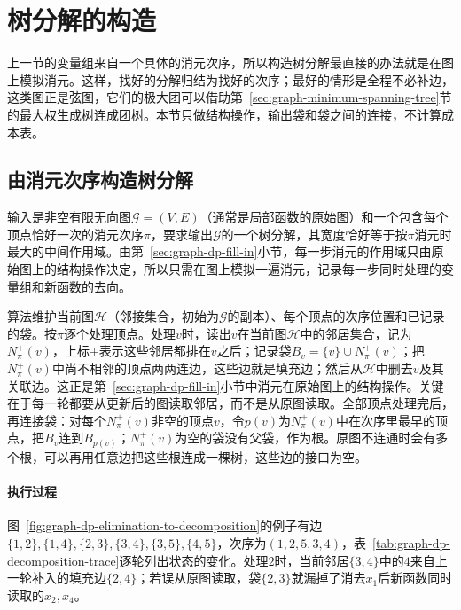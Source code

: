 
\section{树分解的构造}
\label{sec:graph-tree-decomposition-construction}

上一节的变量组来自一个具体的消元次序，所以构造树分解最直接的办法就是在图上模拟消元。这样，找好的分解归结为找好的次序；最好的情形是全程不必补边，这类图正是弦图，它们的极大团可以借助第~\ref{sec:graph-minimum-spanning-tree}节的最大权生成树连成团树。本节只做结构操作，输出袋和袋之间的连接，不计算成本表。

\subsection{由消元次序构造树分解}
\label{sec:graph-dp-order-to-decomposition}

输入是非空有限无向图$\mathcal G=(V,E)$（通常是局部函数的原始图）和一个包含每个顶点恰好一次的消元次序$\pi$，要求输出$\mathcal G$的一个树分解，其宽度恰好等于按$\pi$消元时最大的中间作用域。由第~\ref{sec:graph-dp-fill-in}小节，每一步消元的作用域只由原始图上的结构操作决定，所以只需在图上模拟一遍消元，记录每一步同时处理的变量组和新函数的去向。

算法维护当前图$\mathcal H$（邻接集合，初始为$\mathcal G$的副本）、每个顶点的次序位置和已记录的袋。按$\pi$逐个处理顶点。处理$v$时，读出$v$在当前图$\mathcal H$中的邻居集合，记为$N^+_\pi(v)$，上标$+$表示这些邻居都排在$v$之后；记录袋$B_v=\{v\}\cup N^+_\pi(v)$；把$N^+_\pi(v)$中尚不相邻的顶点两两连边，这些边就是填充边；然后从$\mathcal H$中删去$v$及其关联边。这正是第~\ref{sec:graph-dp-fill-in}小节中消元在原始图上的结构操作。关键在于每一轮都要从更新后的图读取邻居，而不是从原图读取。全部顶点处理完后，再连接袋：对每个$N^+_\pi(v)$非空的顶点$v$，令$p(v)$为$N^+_\pi(v)$中在次序里最早的顶点，把$B_v$连到$B_{p(v)}$；$N^+_\pi(v)$为空的袋没有父袋，作为根。原图不连通时会有多个根，可以再用任意边把这些根连成一棵树，这些边的接口为空。

\paragraph{执行过程}
图~\ref{fig:graph-dp-elimination-to-decomposition}的例子有边$\{1,2\},\allowbreak\{1,4\},\allowbreak\{2,3\},\allowbreak\{3,4\},\allowbreak\{3,5\},\allowbreak\{4,5\}$，次序为$(1,2,5,3,4)$，表~\ref{tab:graph-dp-decomposition-trace}逐轮列出状态的变化。处理$2$时，当前邻居$\{3,4\}$中的$4$来自上一轮补入的填充边$\{2,4\}$；若误从原图读取，袋$\{2,3\}$就漏掉了消去$x_1$后新函数同时读取的$x_2,x_4$。

